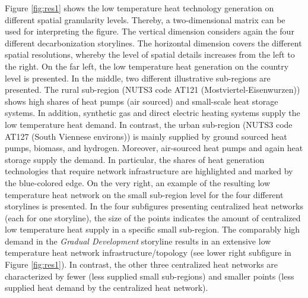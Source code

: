 Figure \ref{fig:res1} shows the low temperature heat technology generation on different spatial granularity levels. Thereby, a two-dimensional matrix can be used for interpreting the figure. The vertical dimension considers again the four different decarbonization storylines. The horizontal dimension covers the different spatial resolutions, whereby the level of spatial details increases from the left to the right. On the far left, the low temperature heat generation on the country level is presented. In the middle, two different illustrative sub-regions are presented. The rural sub-region (NUTS3 code AT121 (Mostviertel-Eisenwurzen)) shows high shares of heat pumps (air sourced) and small-scale heat storage systems. In addition, synthetic gas and direct electric heating systems supply the low temperature heat demand. In contrast, the urban sub-region (NUTS3 code AT127 (South Viennese environs)) is mainly supplied by ground sourced heat pumps, biomass, and hydrogen. Moreover, air-sourced heat pumps and again heat storage supply the demand. In particular, the shares of heat generation technologies that require network infrastructure are highlighted and marked by the blue-colored edge. On the very right, an example of the resulting low temperature heat network on the small sub-region level for the four different storylines is presented. In the four subfigures presenting centralized heat networks (each for one storyline), the size of the points indicates the amount of centralized low temperature heat supply in a specific small sub-region. The comparably high demand in the \textit{Gradual Development} storyline results in an extensive low temperature heat network infrastructure/topology (see lower right subfigure in Figure \ref{fig:res1}). In contrast, the other three centralized heat networks are characterized by fewer (less supplied small sub-regions) and smaller points (less supplied heat demand by the centralized heat network).

